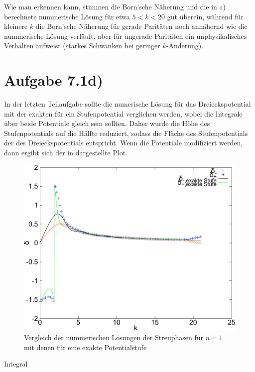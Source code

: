 Wie man erkennen kann, stimmen die Born'sche Näherung und die in a) berechnete
nummerische Lösung für etwa $5<k<20$ gut überein, während für kleinere $k$ die
Born'sche Näherung für gerade Paritäten noch annähernd wie die nummerische Lösung
verläuft, aber für ungerade Paritäten ein unphysikalisches Verhalten aufweist (starkes
Schwanken bei geringer $k$-Änderung).

\section*{Aufgabe 7.1d)}
In der letzten Teilaufgabe sollte die numerische Lösung für das Dreieckspotential
mit der exakten für ein Stufenpotential verglichen werden, wobei die Integrale über
beide Potentiale gleich sein sollten. Daher wurde die Höhe des Stufenpotentials auf
die Hälfte reduziert, sodass die Fläche des Stufenpotentials der des Dreieckspotentials
entspricht. Wenn die Potentiale modifiziert werden, dann ergibt sich der in 
dargestellte Plot.

\begin{figure}[htb]
  \centering
  \includegraphics[width=0.8\columnwidth,keepaspectratio]{../tmp/71d-crop}
  \caption{Vergleich der nummerischen Lösungen der Streuphasen für $n=1$ mit denen für eine
  exakte Potentialstufe}
  \label{fig:1d}
\end{figure}
Integral 